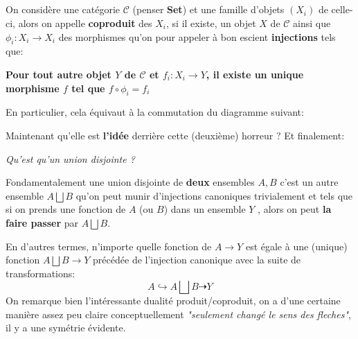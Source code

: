 \documentclass{report}
\begin{document}
\subsection*{}
On considère une catégorie \(\mathcal{C}\) (penser \textbf{Set}) et une famille d'objets \((X_i)\) de celle-ci, alors on appelle \textbf{coproduit} des \(X_i\), si il existe, un objet \(X\) de \(\mathcal{C}\) ainsi que \(\phi_i : X_i \longrightarrow X_i\) des morphismes qu'on pour appeler à bon escient \textbf{injections} tels que:
\begin{center}
   \textbf{Pour tout autre objet \(Y\) de \(\mathcal{C}\) et \(f_i : X_i \longrightarrow Y\), il existe un unique morphisme \(f\) tel que \(f \circ \phi_i = f_i\)}
\end{center}
En particulier, cela équivaut à la commutation du diagramme suivant:
\begin{center}
\end{center}
Maintenant qu'elle est \textbf{l'idée} derrière cette (deuxième) horreur ? Et finalement:
\begin{center}
   \textit{Qu'est qu'un union disjointe ?}
\end{center}
Fondamentalement une union disjointe de \textbf{deux} ensembles \(A, B\) c'est un autre ensemble \(A \bigsqcup B\) qu'on peut munir d'injections canoniques trivialement et tels que si on prends une fonction de \(A\) (ou \(B\)) dans un ensemble \(Y\) , alors on peut \textbf{la faire passer} par \(A \bigsqcup B\).\<

En d'autres termes, n'importe quelle fonction de \(A \longrightarrow Y\) est égale à une (unique) fonction \(A \bigsqcup B \longrightarrow Y\) précédée de l'injection canonique avec la suite de transformations:
\[
   A \hookrightarrow A \bigsqcup B \dashrightarrow Y
\]
On remarque bien l'intéressante dualité produit/coproduit, on a d'une certaine manière assez peu claire conceptuellement \textit{"seulement changé le sens des fleches"}, il y a une symétrie évidente.
\end{document}
